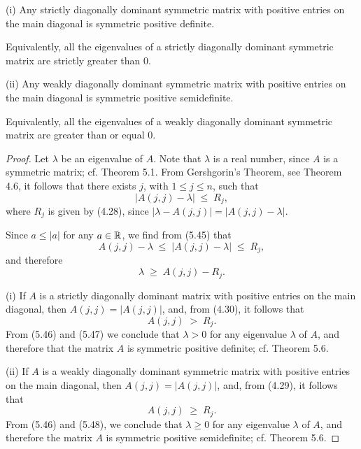 \begin{theorem}
(i) Any strictly diagonally dominant symmetric matrix with positive entries on the main
diagonal is symmetric positive definite.

Equivalently, all the eigenvalues of a strictly diagonally dominant symmetric matrix
are strictly greater than $0$.

(ii) Any weakly diagonally dominant symmetric matrix with positive entries on the main
diagonal is symmetric positive semidefinite.

Equivalently, all the eigenvalues of a weakly diagonally dominant symmetric matrix are
greater than or equal $0$.
\end{theorem}

\begin{proof}
Let $\lambda$ be an eigenvalue of $A$. Note that $\lambda$ is a real number, since $A$
is a symmetric matrix; cf. Theorem 5.1.
From Gershgorin's Theorem, see Theorem 4.6, it follows that there exists $j$, with
$1 \leq j \leq n$, such that
\begin{equation}
|A(j,j) - \lambda| \;\leq\; R_j,
\end{equation}
where $R_j$ is given by (4.28), since $|\lambda - A(j,j)| = |A(j,j) - \lambda|$.

Since $a \leq |a|$ for any $a \in \mathbb{R}$, we find from (5.45) that
\[
A(j,j) - \lambda \;\leq\; |A(j,j) - \lambda| \;\leq\; R_j,
\]
and therefore
\begin{equation}
\lambda \;\geq\; A(j,j) - R_j.
\end{equation}

(i) If $A$ is a strictly diagonally dominant matrix with positive entries on the main
diagonal, then $A(j,j) = |A(j,j)|$, and, from (4.30), it follows that
\begin{equation}
A(j,j) \;>\; R_j.
\end{equation}
From (5.46) and (5.47) we conclude that $\lambda > 0$ for any eigenvalue $\lambda$ of
$A$, and therefore that the matrix $A$ is symmetric positive definite; cf. Theorem 5.6.

(ii) If $A$ is a weakly diagonally dominant symmetric matrix with positive entries on
the main diagonal, then $A(j,j) = |A(j,j)|$, and, from (4.29), it follows that
\begin{equation}
A(j,j) \;\geq\; R_j.
\end{equation}
From (5.46) and (5.48), we conclude that $\lambda \geq 0$ for any eigenvalue $\lambda$
of $A$, and therefore the matrix $A$ is symmetric positive semidefinite; cf. Theorem
5.6.
\end{proof}

